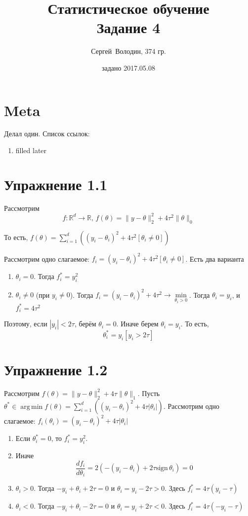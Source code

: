\documentclass[a4paper]{article}
\title{Статистическое обучение\\Задание 4}
\date{задано 2017.05.08}
\author{Сергей~Володин, 374 гр.}
\DeclareMathOperator*{\argmin}{arg\,min}
\newcommand{\sign}{\mbox{sign}\,}
\newcommand{\R}{\mathbb{R}}
\begin{document}
\maketitle
\section*{Meta}
Делал один. Список ссылок:
\begin{enumerate}
\item filled later
\end{enumerate}
\section*{Упражнение 1.1}
Рассмотрим
$$f\colon \R^d\to \R,\,f(\theta)=\|y-\theta\|_2^2+4\tau^2\|\theta\|_0$$

То есть, $f(\theta)=\sum\limits_{i=1}^d\left((y_i-\theta_i)^2+4\tau^2[\theta_i\neq0]\right)$

Рассмотрим одно слагаемое: $f_i=(y_i-\theta_i)^2+4\tau^2[\theta_i\neq 0]$. Есть два варианта\begin{enumerate}
	\item $\theta_i=0$. Тогда $f^*_i=y_i^2$
	\item $\theta_i\neq 0$ (при $y_i\neq 0$). Тогда $f_i=(y_i-\theta_i)^2+4\tau^2\to\min\limits_{\theta_i>0}$. Тогда $\theta_i=y_i$, и $f^*_i=4\tau^2$
\end{enumerate}
Поэтому, если $|y_i|<2\tau$, берём $\theta_i=0$. Иначе берем $\theta_i=y_i$. То есть,
$$
\theta_i^*=y_i[y_i>2\tau]
$$
\section*{Упражнение 1.2}
Рассмотрим $f(\theta)=\|y-\theta\|_2^2+4\tau\|\theta\|_1$. Пусть $\theta^*\in\argmin f(\theta)=\sum\limits_{i=1}^d\left((y_i-\theta_i)^2+4\tau |\theta_i|\right)$.
Рассмотрим одно слагаемое: $f_i(\theta_i)=(y_i-\theta_i)^2+4\tau|\theta_i|$
\begin{enumerate}
	\item Если $\theta_i^*=0$, то $f_i^*=y_i^2$.
	\item Иначе
$$\frac{d f_i}{d \theta_i}=2(-(y_i-\theta_i)+2\tau \sign\theta_i)=0$$
\item $\theta_i>0$. Тогда $-y_i+\theta_i+2\tau=0$ и $\theta_i=y_i-2\tau>0$. Здесь $f_i^*=4\tau(y_i-\tau)$
\item $\theta_i<0$. Тогда $-y_i+\theta_i-2\tau=0$ и $\theta_i=y_i+2\tau<0$. Здесь $f_i^*=4\tau (-y_i-\tau)$
\end{enumerate}
\end{document}
